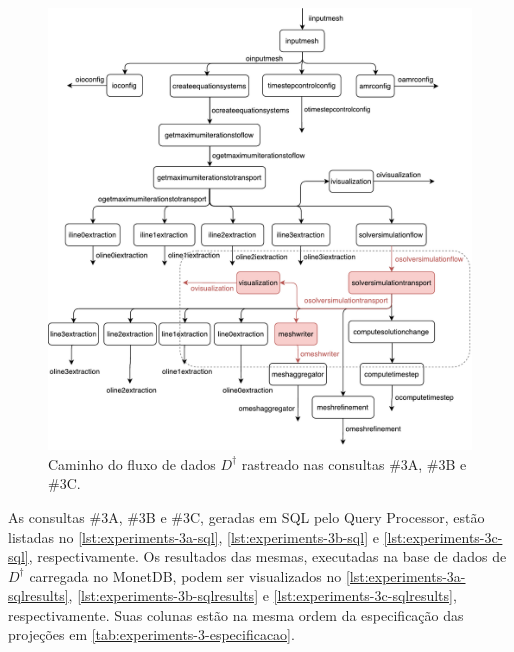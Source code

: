 \begin{figure}[htb]
    \centering
    \includegraphics[width=\textwidth]{img/experiments-dataflow-3}
    \caption[Caminho do fluxo de dados \(D^{\dagger}\) rastreado nas consultas \#3A, \#3B e \#3C]{Caminho do fluxo de dados \(D^{\dagger}\) rastreado nas consultas \#3A, \#3B e \#3C.}%
    \label{fig:experiments-dataflow-3}
\end{figure}

As consultas \#3A, \#3B e \#3C, geradas em SQL pelo Query Processor, estão listadas no \autoref{lst:experiments-3a-sql}, \autoref{lst:experiments-3b-sql} e \autoref{lst:experiments-3c-sql}, respectivamente. Os resultados das mesmas, executadas na base de dados de \(D^{\dagger}\) carregada no MonetDB, podem ser visualizados no \autoref{lst:experiments-3a-sqlresults}, \autoref{lst:experiments-3b-sqlresults} e \autoref{lst:experiments-3c-sqlresults}, respectivamente. Suas colunas estão na mesma ordem da especificação das projeções em \autoref{tab:experiments-3-especificacao}.

